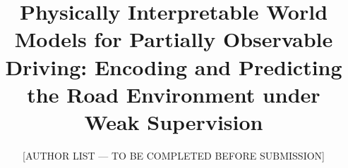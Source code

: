 \documentclass[preprint,12pt]{elsarticle}
\begin{document}
\begin{frontmatter}

\title{Physically Interpretable World Models for Partially Observable
       Driving: Encoding and Predicting the Road Environment under
       Weak Supervision}

\author[uf]{[AUTHOR LIST --- TO BE COMPLETED BEFORE SUBMISSION]}



\end{frontmatter}
\end{document}
